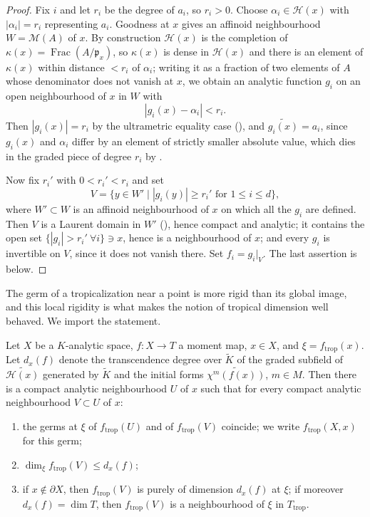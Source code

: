 \begin{proof}
Fix $i$ and let $r_i$ be the degree of $a_i$, so $r_i>0$. Choose
$\alpha_i\in\mathcal H(x)$ with $|\alpha_i|=r_i$ representing $a_i$.
Goodness at $x$ gives an affinoid neighbourhood $W=\mathcal M(A)$ of $x$.
By construction $\mathcal H(x)$ is the completion of
$\kappa(x)=\operatorname{Frac}(A/\mathfrak p_x)$, so $\kappa(x)$ is dense in
$\mathcal H(x)$ and there is an element of $\kappa(x)$ within distance
$<r_i$ of $\alpha_i$; writing it as a fraction of two elements of $A$ whose
denominator does not vanish at $x$, we obtain an analytic function $g_i$ on
an open neighbourhood of $x$ in $W$ with
\[
 |g_i(x)-\alpha_i|<r_i .
\]
Then $|g_i(x)|=r_i$ by the ultrametric equality case
(), and $\widetilde{g_i(x)}=a_i$, since
$g_i(x)$ and $\alpha_i$ differ by an element of strictly smaller absolute
value, which dies in the graded piece of degree $r_i$ by
.

Now fix $r_i'$ with $0<r_i'<r_i$ and set
\[
 V=\{y\in W'\mid |g_i(y)|\ge r_i'\text{ for }1\le i\le d\},
\]
where $W'\subset W$ is an affinoid neighbourhood of $x$ on which all the
$g_i$ are defined. Then $V$ is a Laurent domain in $W'$
(), hence compact and analytic; it
contains the open set $\{|g_i|>r_i'\ \forall i\}\ni x$, hence is a
neighbourhood of $x$; and every $g_i$ is invertible on $V$, since it does
not vanish there. Set $f_i=g_i|_V$. The last assertion is
 below.
\end{proof}

The germ of a tropicalization near a point is more rigid than its global
image, and this local rigidity is what makes the notion of tropical
dimension well behaved. We import the statement.

\begin{theorem}
\label{thm:trop-local-germ}
Let $X$ be a $K$-analytic space, $f:X\to T$ a moment map, $x\in X$, and
$\xi=f_{\mathrm{trop}}(x)$. Let $d_x(f)$ denote the transcendence degree
over $\widetilde K$ of the graded subfield of $\widetilde{\mathcal H(x)}$
generated by $\widetilde K$ and the initial forms
$\widetilde{\chi^m(f(x))}$, $m\in M$. Then there is a compact analytic
neighbourhood $U$ of $x$ such that for every compact analytic
neighbourhood $V\subset U$ of $x$:
\begin{enumerate}
\item\label{itm:trop-germ:germ} the germs at $\xi$ of
  $f_{\mathrm{trop}}(U)$ and of $f_{\mathrm{trop}}(V)$ coincide; we write
  $f_{\mathrm{trop}}(X,x)$ for this germ;
\item\label{itm:trop-germ:bound}
  $\dim_\xi f_{\mathrm{trop}}(V)\le d_x(f)$;
\item\label{itm:trop-germ:interior} if $x\notin\partial X$, then
  $f_{\mathrm{trop}}(V)$ is purely of dimension $d_x(f)$ at $\xi$; if
  moreover $d_x(f)=\dim T$, then $f_{\mathrm{trop}}(V)$ is a neighbourhood of
  $\xi$ in $T_{\mathrm{trop}}$.
\end{enumerate}
\end{theorem}

